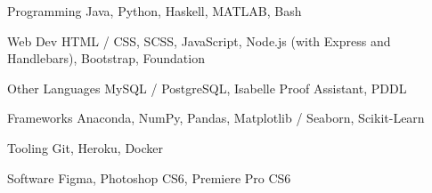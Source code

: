 

\begin{cvskills}

  \cvskill
    {Programming} %
    {Java, Python, Haskell, MATLAB, Bash} %
    
  \cvskill
    {Web Dev} %
    {HTML / CSS, SCSS, JavaScript, Node.js (with Express and Handlebars), Bootstrap, Foundation}

  \cvskill
    {Other Languages} %
    {MySQL / PostgreSQL, Isabelle Proof Assistant, PDDL}
    
  \cvskill
    {Frameworks} %
    {Anaconda, NumPy, Pandas, Matplotlib / Seaborn, Scikit-Learn}
    
  \cvskill
    {Tooling} %
    {Git, Heroku, Docker}
    
  \cvskill
    {Software} %
    {Figma, Photoshop CS6, Premiere Pro CS6}

\end{cvskills}

